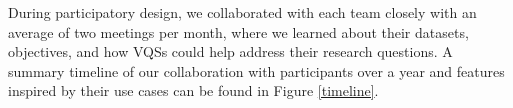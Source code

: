 \par During participatory design, we collaborated with each team closely with an average of two meetings per month, where we learned about their datasets, objectives, and how VQSs could help address their research questions. A summary timeline of our collaboration with participants over a year and features inspired by their use cases can be found in Figure \ref{timeline}. 
